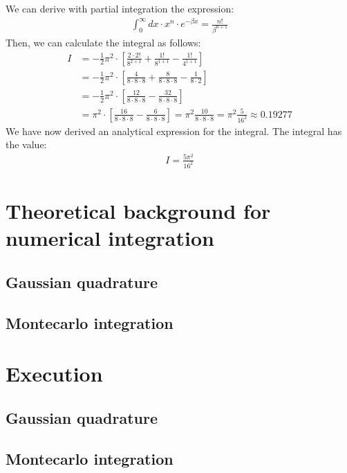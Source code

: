 \documentclass[10pt,a4paper]{article}
\begin{document}
We can derive with partial integration the expression:
\begin{align}
\int_{0}^{\infty} dx \cdot x^n \cdot e^{- \beta x } = \frac{n!}{\beta^{n+1}}
\end{align}
Then, we can calculate the integral as follows:
\begin{align}
I&= -\frac{1}{2} \pi^2 \cdot \left[ \frac{2 \cdot 2!}{8^{2+1}}+ \frac{1!}{8^{1+1}} - \frac{1!}{4^{1+1}} \right]\\
&= -\frac{1}{2} \pi^2 \cdot \left[ \frac{4}{8 \cdot8 \cdot 8}+ \frac{8}{8 \cdot 8 \cdot 8} - \frac{1}{8 \cdot 2} \right]\\
&= -\frac{1}{2} \pi^2 \cdot \left[ \frac{12}{8 \cdot8 \cdot 8} - \frac{32}{8 \cdot 8 \cdot 8} \right]\\
&= \pi^2 \cdot \left[ \frac{16}{8 \cdot 8 \cdot 8}- \frac{6}{8 \cdot 8 \cdot 8} \right]= \pi^2 \frac{10}{8 \cdot 8 \cdot 8}= \pi^2 \frac{5}{16^2}\approx 0.19277
\end{align}
We have now derived an analytical expression for the integral. The integral has the value:
\begin{align}
I = \frac{5 \pi^2}{16^2}
\end{align}

\section{Theoretical background for numerical integration}

\subsection{Gaussian quadrature}

\subsection{Montecarlo integration}

\section{Execution}

\subsection{Gaussian quadrature}

\subsection{Montecarlo integration}
\end{document}
